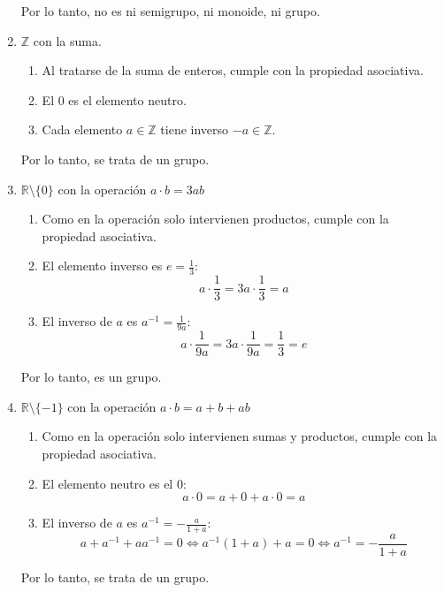 \begin{enumerate}
    Por lo tanto, no es ni semigrupo, ni monoide, ni grupo.

    \item $\mathbb{Z}$ con la suma.

    \begin{enumerate}
        \item Al tratarse de la suma de enteros, cumple con la propiedad asociativa.
        \item El 0 es el elemento neutro.
        \item Cada elemento $a \in \mathbb{Z}$ tiene inverso $-a \in \mathbb{Z}$.
    \end{enumerate}
    
    Por lo tanto, se trata de un grupo.

    \item $\mathbb{R}\setminus \{0\}$ con la operación $a \cdot b = 3ab$
    
    \begin{enumerate}
        \item Como en la operación solo intervienen productos, cumple con la propiedad asociativa.
        \item El elemento inverso es $e=\frac{1}{3}$:
            \begin{equation}
                a \cdot \frac{1}{3} = 3a\cdot \frac{1}{3} = a
            \end{equation}
        \item El inverso de $a$ es $a^{-1} = \frac{1}{9a}$:
            \begin{equation}
                a \cdot \frac{1}{9a} = 3a \cdot \frac{1}{9a} = \frac{1}{3} = e
            \end{equation}
    \end{enumerate}

    Por lo tanto, es un grupo.

    \item $\mathbb{R}\setminus \{-1\}$ con la operación $a \cdot b = a + b + ab$
    \begin{enumerate}
        \item Como en la operación solo intervienen sumas y productos, cumple con la propiedad asociativa.
        \item El elemento neutro es el 0:
        \begin{equation}
            a \cdot 0 = a + 0 + a\cdot 0 = a
        \end{equation}
        \item El inverso de $a$ es $a^{-1} = -\frac{a}{1+a}$:
        \begin{equation}
            a + a^{-1} + aa^{-1} = 0 \iff a^{-1}(1 + a) + a = 0 \iff a^{-1} = -\frac{a}{1+a}
        \end{equation}
    \end{enumerate}

    Por lo tanto, se trata de un grupo.
\end{enumerate}
